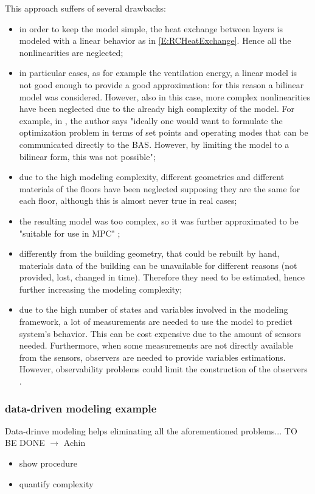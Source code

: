 \textcolor[rgb]{0,0,1}{This approach suffers of several drawbacks:
\begin{itemize}
	\item in order to keep the model simple, the heat exchange between layers is modeled with a linear behavior as in \eqref{E:RCHeatExchange}. Hence all the nonlinearities are neglected;
	\item in particular cases, as for example the ventilation energy, a linear model is not good enough to provide a good approximation: for this reason a bilinear model was considered.
	However, also in this case, more complex nonlinearities have been neglected due to the already high complexity of the model.
	For example, in \cite{Sturzenegger2016}, the author says "ideally one would want to formulate the optimization problem in terms of set points and operating modes that can be communicated directly to the BAS.
	However, by limiting the model to a bilinear form, this was not possible";
	\item due to the high modeling complexity, different geometries and different materials of the floors have been neglected supposing they are the same for each floor, although this is almost never true in real cases;  
	\item the resulting model was too complex, so it was further approximated to be "suitable for use in MPC" \cite{SturzeneggerTR};
	\item differently from the building geometry, that could be rebuilt by hand, materials data of the building can be unavailable for different reasons (not provided, lost, changed in time).
	Therefore they need to be estimated, hence further increasing the modeling complexity;
	\item due to the high number of states and variables involved in the modeling framework, a lot of measurements are needed to use the model to predict system's behavior.
	This can be cost expensive due to the amount of sensors needed.
	Furthermore, when some measurements are not directly available from the sensors, observers are needed to provide variables estimations.
	However, observability problems could limit the construction of the observers \cite{Dorf2011MCS}. 
\end{itemize}
}

\subsubsection{data-driven modeling example}
\textcolor[rgb]{0,0,1}{Data-drinve modeling helps eliminating all the aforementioned problems...}
TO BE DONE $\rightarrow$ \textcolor[rgb]{0,0,1}{Achin}
\begin{itemize}
	\item show procedure
	\item quantify complexity
\end{itemize}


